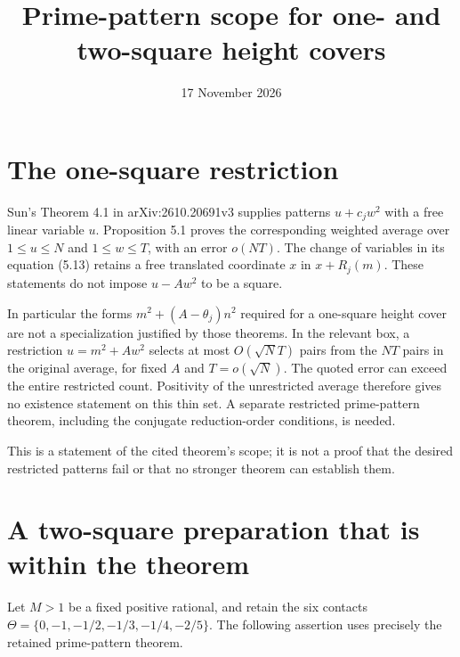 \documentclass[11pt,a4paper]{article}
\title{Prime-pattern scope for one- and two-square height covers}
\author{}\date{17 November 2026}
\begin{document}
\maketitle

\section*{The one-square restriction}
Sun's Theorem 4.1 in arXiv:2610.20691v3 supplies patterns
$u+c_jw^2$ with a free linear variable $u$. Proposition 5.1 proves
the corresponding weighted average over $1\le u\le N$ and
$1\le w\le T$, with an error $o(NT)$. The change of variables
in its equation (5.13) retains a free translated coordinate $x$ in
$x+R_j(m)$. These statements do not impose $u-Aw^2$ to be a square.

In particular the forms $m^2+(A-\theta_j)n^2$ required for a
one-square height cover are not a specialization justified by those
theorems. In the relevant box, a restriction
$u=m^2+Aw^2$ selects at most $O(\sqrt N T)$ pairs from the
$NT$ pairs in the original average, for fixed $A$ and
$T=o(\sqrt N)$. The quoted error can exceed the entire restricted
count. Positivity of the unrestricted average therefore gives no
existence statement on this thin set. A separate restricted prime-pattern
theorem, including the conjugate reduction-order conditions, is needed.

This is a statement of the cited theorem's scope; it is not a proof
that the desired restricted patterns fail or that no stronger theorem
can establish them.

\section*{A two-square preparation that is within the theorem}
Let $M>1$ be a fixed positive rational, and retain the six contacts
$\Theta=\{0,-1,-1/2,-1/3,-1/4,-2/5\}$. The following assertion
uses precisely the retained prime-pattern theorem.
\end{document}
